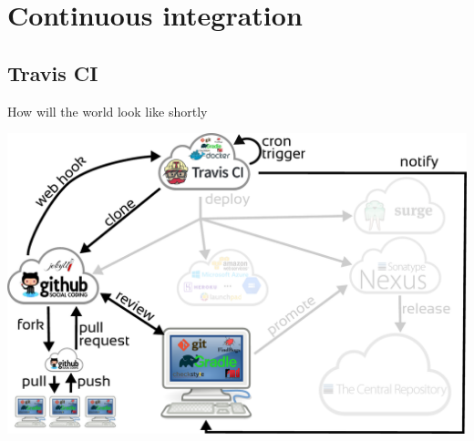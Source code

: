 \documentclass[presentation]{beamer}
\begin{document}
\section{Continuous integration}

\subsection{Travis CI}

\begin{frame}[fragile]{How will the world look like shortly}
	\begin{center}
		\includegraphics[width=.9\textwidth]{images/ci-travis}
	\end{center}
\end{frame}
\end{document}
